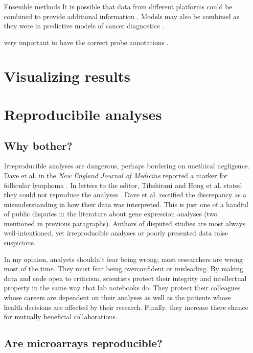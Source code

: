 Ensemble methods
It is possible that data from different platforms could be combined
to provide additional information \cite{Hockley:2009tf}.
Models may also be combined as they were in predictive models
of cancer diagnostics \cite{Chen:2011ib}.

very important to have the correct probe annotations \cite{Carter:2005bq}.

\section{Visualizing results}

\section{Reproducibile analyses}

\subsection{Why bother?}

Irreproducible analyses are dangerous, perhaps bordering on unethical negligence. 
Dave et al. in the \textit{New England
Journal of Medicine} reported a marker for follicular lymphoma \cite{Dave:2004vl}. 
In letters to the editor, Tibshirani and Hong et al. stated they 
could not reproduce the analyses \cite{Tibshirani:2005el}. 
Dave et al. rectified the discrepancy as a misunderstanding
in how their data was interpreted. This is just one of a handful of
public disputes in the literature about gene expression analyses (two mentioned
in previous paragraphs).
Authors of disputed studies are most always well-intentioned, yet 
irreproducible analyses or poorly presented data raise suspicions.

In my opinion, analysts shouldn't fear being wrong; most researchers
are wrong most of the time. They must fear being overconfident or misleading. 
By making data and code open to criticism,
scientists protect their integrity and intellectual property in the same
way that lab notebooks do. They protect their colleagues
whose careers are dependent on their analyses as well as the patients
whose health decisions are affected by their research.
Finally, they increase there chance for mutually beneficial collaborations.

\subsection{Are microarrays reproducible?}

